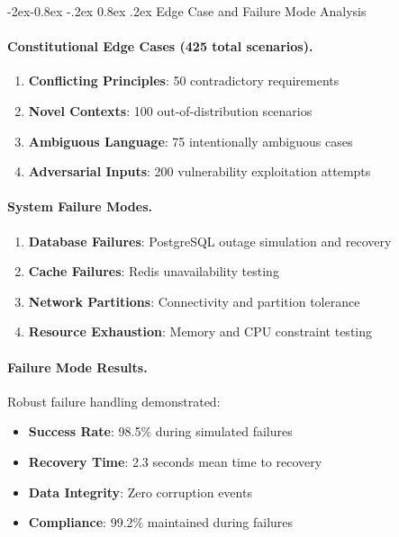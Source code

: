\documentclass[manuscript,screen,9pt]{acmart}
\makeatletter
\renewcommand\subsubsection{\@startsection{subsubsection}{3}{\z@}%
  {-2ex\@plus -0.8ex \@minus -.2ex}%
  {0.8ex \@plus .2ex}%
  {\normalfont\normalsize\bfseries}}
\makeatother
\begin{document}
\subsubsection{Edge Case and Failure Mode Analysis}
\label{subsubsec:edge_case_analysis}

\paragraph{Constitutional Edge Cases (425 total scenarios).}
\begin{enumerate}[leftmargin=*,itemsep=1pt,parsep=1pt]
    \item \textbf{Conflicting Principles}: 50 contradictory requirements
    \item \textbf{Novel Contexts}: 100 out-of-distribution scenarios
    \item \textbf{Ambiguous Language}: 75 intentionally ambiguous cases
    \item \textbf{Adversarial Inputs}: 200 vulnerability exploitation attempts
\end{enumerate}

\paragraph{System Failure Modes.}
\begin{enumerate}[leftmargin=*,itemsep=1pt,parsep=1pt]
    \item \textbf{Database Failures}: PostgreSQL outage simulation and recovery
    \item \textbf{Cache Failures}: Redis unavailability testing
    \item \textbf{Network Partitions}: Connectivity and partition tolerance
    \item \textbf{Resource Exhaustion}: Memory and CPU constraint testing
\end{enumerate}

\paragraph{Failure Mode Results.}
Robust failure handling demonstrated:
\begin{itemize}[leftmargin=*,itemsep=1pt,parsep=1pt]
    \item \textbf{Success Rate}: 98.5\% during simulated failures
    \item \textbf{Recovery Time}: 2.3 seconds mean time to recovery
    \item \textbf{Data Integrity}: Zero corruption events
    \item \textbf{Compliance}: 99.2\% maintained during failures
\end{itemize}
\end{document}
